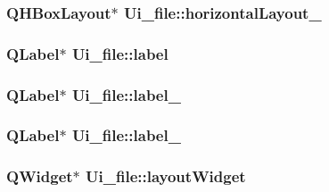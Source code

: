 \hypertarget{classUi__file_a2b17ff0563f5ef520624a032b393dd9d}{
\subsubsection[{horizontal\-Layout\-\_\-4}]{\setlength{\rightskip}{0pt plus 5cm}Q\-H\-Box\-Layout$\ast$ Ui\-\_\-file\-::horizontal\-Layout\-\_}}\label{classUi__file_a2b17ff0563f5ef520624a032b393dd9d}
\hypertarget{classUi__file_a179e5306f23c3cb3951f6bf3fd2ab6ea}{
\subsubsection[{label}]{\setlength{\rightskip}{0pt plus 5cm}Q\-Label$\ast$ Ui\-\_\-file\-::label}}\label{classUi__file_a179e5306f23c3cb3951f6bf3fd2ab6ea}
\hypertarget{classUi__file_ab164b9d8a9dc6ded9bf0e8513a4a79e9}{
\subsubsection[{label\-\_\-2}]{\setlength{\rightskip}{0pt plus 5cm}Q\-Label$\ast$ Ui\-\_\-file\-::label\-\_}}\label{classUi__file_ab164b9d8a9dc6ded9bf0e8513a4a79e9}
\hypertarget{classUi__file_a76e6c67ba5c7a35809fc27fcd84c4a2d}{
\subsubsection[{label\-\_\-3}]{\setlength{\rightskip}{0pt plus 5cm}Q\-Label$\ast$ Ui\-\_\-file\-::label\-\_}}\label{classUi__file_a76e6c67ba5c7a35809fc27fcd84c4a2d}
\hypertarget{classUi__file_a819bd4ef1c08655c8f3572af0d1404ac}{
\subsubsection[{layout\-Widget}]{\setlength{\rightskip}{0pt plus 5cm}Q\-Widget$\ast$ Ui\-\_\-file\-::layout\-Widget}}\label{classUi__file_a819bd4ef1c08655c8f3572af0d1404ac}
